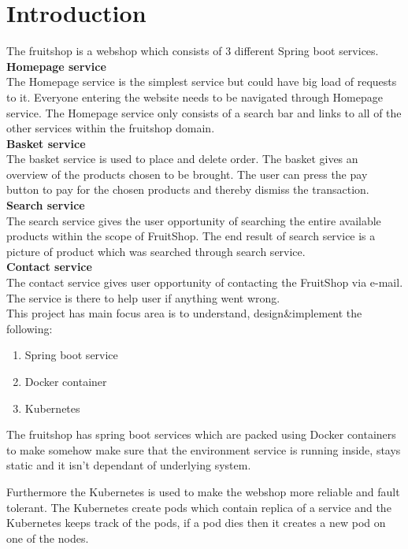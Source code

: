 \chapter{Introduction}\label{ch:introduction}

The fruitshop is a webshop which consists of 3 different Spring boot services.\\ 


\textbf{Homepage service}\\
The Homepage service is the simplest service but could have big load of requests to it. Everyone entering the website needs to be navigated through Homepage service. 
The Homepage service only consists of a search bar and links to all of the other services within the fruitshop domain.\\ 

\textbf{Basket service }\\
The basket service is used to place and delete order. The basket gives an overview of the products chosen to be brought. The user can press the pay button to pay for the chosen products and thereby dismiss the transaction.\\ 

\textbf{Search service }\\
The search service gives the user opportunity of searching the entire available products within the scope of FruitShop. The end result of search service is a picture of product which was searched through search service.\\   

\textbf{Contact service}\\
The contact service gives user opportunity of contacting the FruitShop via e-mail. The service is there to help user if anything went wrong.\\


This project has main focus area is to understand, design&implement the following:  

\begin{enumerate}
	\item Spring boot service
	\item Docker container
	\item Kubernetes
\end{enumerate}

The fruitshop has spring boot services which are packed using Docker containers to make somehow make sure that the environment service is running inside, stays static and it isn't dependant of underlying system. 

Furthermore the Kubernetes is used to make the webshop more reliable and fault tolerant. The Kubernetes create pods which contain replica of a service and the Kubernetes keeps track of the pods, if a pod dies then it creates a new pod on one of the nodes. 
 